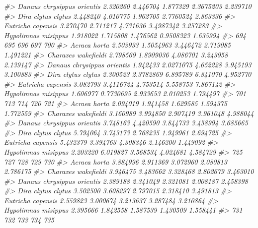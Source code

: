 \documentclass[
]{article}
\newenvironment{Shaded}{\begin{snugshade}}{\end{snugshade}}
\newcommand{\CommentTok}[1]{\textcolor[rgb]{0.56,0.35,0.01}{\textit{#1}}}
\begin{document}
\begin{Shaded}
\begin{Highlighting}[]
\CommentTok{\#\textgreater{} Danaus chrysippus orientis 2.320260 2.446704 1.877329 2.3675203 2.239710}
\CommentTok{\#\textgreater{} Dira clytus clytus         2.448240 4.010775 1.962705 2.7760524 2.863336}
\CommentTok{\#\textgreater{} Eutricha capensis          3.270470 2.711217 4.731636 3.4987342 3.257283}
\CommentTok{\#\textgreater{} Hypolimnas misippus        1.918022 1.715808 1.476562 0.9508323 1.635994}
\CommentTok{\#\textgreater{}                                 694       695      696      697      700}
\CommentTok{\#\textgreater{} Acraea horta               2.503933 1.5054963 3.446472 2.719085 1.491221}
\CommentTok{\#\textgreater{} Charaxes wakefieldi        2.798569 1.8909036 4.086701 3.243958 2.139147}
\CommentTok{\#\textgreater{} Danaus chrysippus orientis 1.942433 2.0271075 4.652228 3.945193 3.100883}
\CommentTok{\#\textgreater{} Dira clytus clytus         2.300523 2.3782869 6.895789 6.841070 4.952770}
\CommentTok{\#\textgreater{} Eutricha capensis          3.082793 3.4116724 4.753514 5.558753 7.867142}
\CommentTok{\#\textgreater{} Hypolimnas misippus        1.606977 0.7730695 2.933653 2.010253 1.794497}
\CommentTok{\#\textgreater{}                                 701      713      714      720      721}
\CommentTok{\#\textgreater{} Acraea horta               2.094019 1.941458 1.629585 1.594375 1.772559}
\CommentTok{\#\textgreater{} Charaxes wakefieldi        3.160989 3.994850 2.907419 3.961048 4.988044}
\CommentTok{\#\textgreater{} Danaus chrysippus orientis 3.748163 4.420590 3.844733 3.458994 3.685665}
\CommentTok{\#\textgreater{} Dira clytus clytus         5.794064 3.743173 2.768235 1.949961 2.694725}
\CommentTok{\#\textgreater{} Eutricha capensis          5.432379 3.394763 4.308346 2.146200 1.449092}
\CommentTok{\#\textgreater{} Hypolimnas misippus        2.203220 6.019827 3.568534 4.024681 4.584729}
\CommentTok{\#\textgreater{}                                 725      727      728      729      730}
\CommentTok{\#\textgreater{} Acraea horta               3.884996 2.911369 3.072960 2.080813 2.786175}
\CommentTok{\#\textgreater{} Charaxes wakefieldi        3.946475 3.483662 3.328468 2.802679 3.463010}
\CommentTok{\#\textgreater{} Danaus chrysippus orientis 2.389188 2.341049 2.321081 2.008187 2.458398}
\CommentTok{\#\textgreater{} Dira clytus clytus         3.502500 3.608297 2.797015 2.318410 3.491813}
\CommentTok{\#\textgreater{} Eutricha capensis          2.559823 3.000674 3.213637 3.287484 3.210864}
\CommentTok{\#\textgreater{} Hypolimnas misippus        2.395666 1.842558 1.587539 1.430509 1.558441}
\CommentTok{\#\textgreater{}                                 731      732      733      734      735}

\end{Highlighting}
\end{Shaded}
\end{document}
